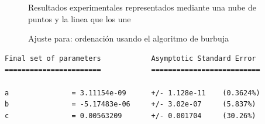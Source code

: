 
\begin{figure}[H]%
    \centering
    \caption{Resultados experimentales representados mediante una nube de puntos y la linea que los une}%
    \centering
    \caption{Ajuste para: ordenación usando el algoritmo de burbuja}%
\end{figure}

\begin{verbatim}
Final set of parameters            Asymptotic Standard Error
=======================            ==========================

a               = 3.11154e-09      +/- 1.128e-11    (0.3624%)
b               = -5.17483e-06     +/- 3.02e-07     (5.837%)
c               = 0.00563209       +/- 0.001704     (30.26%)


\end{verbatim}
